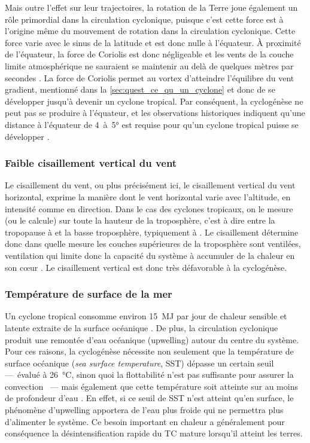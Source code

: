\documentclass[../main.tex]{subfiles}
\begin{document}
Mais outre l'effet sur leur trajectoires, la rotation de la Terre joue également un rôle primordial dans la circulation cyclonique, puisque c'est cette force
est à l'origine même du mouvement de rotation dans la circulation cyclonique. Cette force varie avec le sinus de la latitude et est donc nulle à l'équateur. À
proximité de l'équateur, la force de Coriolis est donc négligeable et les vents de la couche limite atmosphérique ne sauraient se maintenir au delà de quelques
mètres par secondes \parencite{gray_tropical_1975}. La force de Coriolis permet au vortex d'atteindre l'équilibre du vent gradient, mentionné dans la
\cref{sec:quest_ce_qu_un_cyclone} et donc de se développer jusqu'à devenir un cyclone tropical. Par conséquent, la cyclogénèse ne peut pas se produire à
l'équateur, et les observations historiques indiquent qu'une distance à l'équateur de \num{4}~à~\ang{5} est requise pour qu'un cyclone tropical puisse se
développer \parencite{gray_global_1968}.

\subsubsection*{Faible cisaillement vertical du vent}

Le cisaillement du vent, ou plus précisément ici, le cisaillement vertical du vent horizontal, exprime la manière dont le vent horizontal varie avec l'altitude,
en intensité comme en direction. Dans le cas des cyclones tropicaux, on le mesure (ou le calcule) sur toute la hauteur de la troposphère, c'est à dire entre la
tropopause à  et la basse troposphère, typiquement à . Le cisaillement détermine donc dans quelle mesure les couches supérieures de la
troposphère sont ventilées, ventilation qui limite donc la capacité du système à accumuler de la chaleur en son cœur \parencite{gray_tropical_1975}. Le
cisaillement vertical est donc très défavorable à la cyclogénèse.

\subsubsection*{Température de surface de la mer}

Un cyclone tropical consomme environ \SI{15}{\mega\joule} par jour de chaleur sensible et latente extraite de la surface océanique
\parencite{gray_tropical_1975}. De plus, la circulation cyclonique produit une remontée d'eau océanique (upwelling) autour du centre du système. Pour ces
raisons, la cyclogénèse nécessite non seulement que la température de surface océanique (\textit{sea surface temperature}, SST) dépasse un certain seuil
---~évalué à \SI{26}{\degreeCelsius}, sinon quoi la flottabilité n'est pas suffisante pour assurer la convection \parencite{palmen_formation_1948}~--- mais
également que cette température soit atteinte sur au moins  de profondeur d'eau \parencite{leipper_observed_1967,perlboth_hurricane_1967}. En effet, si ce
seuil de SST n'est atteint qu'en surface, le phénomène d'upwelling apportera de l'eau plus froide qui ne permettra plus d'alimenter le système. Ce besoin
important en chaleur a généralement pour conséquence la désintensification rapide du TC mature lorsqu'il atteint les terres.
\end{document}

